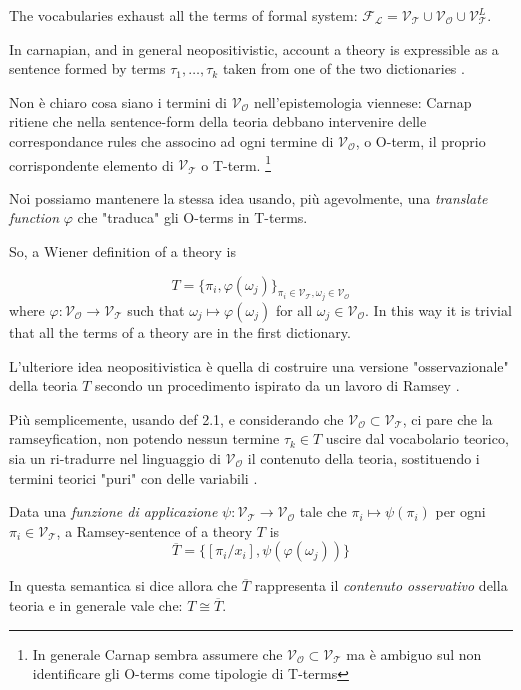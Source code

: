 The vocabularies exhaust all the terms of formal system: $\mathcal{F_L} = \mathcal{V_T} \cup \mathcal{V_O} \cup \mathcal{V}_{\mathcal{T}}^L$.

In carnapian, and in general neopositivistic, account a theory is expressible as a sentence formed by terms $\tau_1, \dots, \tau_k$ taken from one of the two dictionaries \cite{?}. 

Non è chiaro cosa siano i termini di $\mathcal{V_O}$ nell'epistemologia viennese: Carnap ritiene che nella sentence-form della teoria debbano intervenire delle correspondance rules che associno ad ogni termine di $\mathcal{V_O}$, o O-term, il proprio corrispondente elemento di $\mathcal{V_T}$ o T-term. \footnote{In generale Carnap sembra assumere che $\mathcal{V_O} \subset \mathcal{V_T}$ ma è ambiguo sul non identificare gli O-terms come tipologie di T-terms}

Noi possiamo mantenere la stessa idea usando, più agevolmente, una \emph{translate function} $\varphi$ che "traduca" gli O-terms in T-terms. 

So, a Wiener definition of a theory is 

\[  T = \{ \pi_i, \varphi (\omega_j)\}_{\pi_i \in \mathcal{V_T}, \omega_j \in \mathcal{V_O}}
\] 
where $\varphi: \mathcal{V_O} \to \mathcal{V_T}$ such that $\omega_j \mapsto \varphi (\omega_j)$ for all $\omega_j \in \mathcal{V_O}$. In this way it is trivial that all the terms of a theory are in the first dictionary.

L'ulteriore idea neopositivistica è quella di costruire una versione "osservazionale" della teoria $T$ secondo un procedimento ispirato da un lavoro di Ramsey \cite{?}.


Più semplicemente, usando def 2.1, e considerando che $\mathcal{V_O} \subset \mathcal{V_T}$, ci pare che la ramseyfication, non potendo nessun termine $\tau_k \in T$ uscire dal vocabolario teorico, sia un ri-tradurre nel linguaggio di $\mathcal{V_O}$ il contenuto della teoria, sostituendo i termini teorici "puri" con delle variabili \cite{?}.
\begin{definition}
	Data una \emph{funzione di applicazione} $\psi: \mathcal{V_T} \to \mathcal{V_O}$ tale che $\pi_i \mapsto \psi (\pi_i) $ per ogni $\pi_i \in \mathcal{V_T}$, a Ramsey-sentence of a theory $T$ is 
	\[ \overline{T} = \{[\pi_i/x_i], \psi (\varphi (\omega_j))\} 
	\]
\end{definition}



In questa semantica si dice allora che $\overline{T}$ rappresenta il \emph{contenuto osservativo} della teoria e in generale vale che: $T \cong \overline{T}$. 



